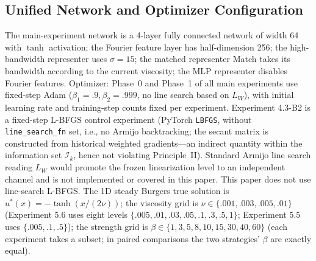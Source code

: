\documentclass[11pt]{article}
\newcommand{\W}{W}
\numberwithin{equation}{section}
\begin{document}
\subsection{Unified Network and Optimizer Configuration}
The main-experiment network is a 4-layer fully connected network of width 64 with $\tanh$ activation; the Fourier feature layer has half-dimension 256; the high-bandwidth representer uses $\sigma=15$; the matched representer Match takes its bandwidth according to the current viscosity; the MLP representer disables Fourier features. Optimizer: Phase~0 and Phase~1 of all main experiments use fixed-step Adam ($\beta_1=.9,\beta_2=.999$, no line search based on $L_\W$), with initial learning rate and training-step counts fixed per experiment. Experiment 4.3-B2 is a fixed-step L-BFGS control experiment (PyTorch \texttt{LBFGS}, without \texttt{line\_search\_fn} set, i.e., no Armijo backtracking; the secant matrix is constructed from historical weighted gradients---an indirect quantity within the information set $\mathcal I_k$, hence not violating Principle~II). Standard Armijo line search reading $L_\W$ would promote the frozen linearization level to an independent channel and is not implemented or covered in this paper. This paper does not use line-search L-BFGS. The 1D steady Burgers true solution is $u^*(x)=-\tanh(x/(2\nu))$; the viscosity grid is $\nu\in\{.001,.003,.005,.01\}$ (Experiment 5.6 uses eight levels $\{.005,.01,.03,.05,.1,.3,.5,1\}$; Experiment 5.5 uses $\{.005,.1,.5\}$); the strength grid is $\beta\in\{1,3,5,8,10,15,30,40,60\}$ (each experiment takes a subset; in paired comparisons the two strategies' $\beta$ are exactly equal).
\end{document}
